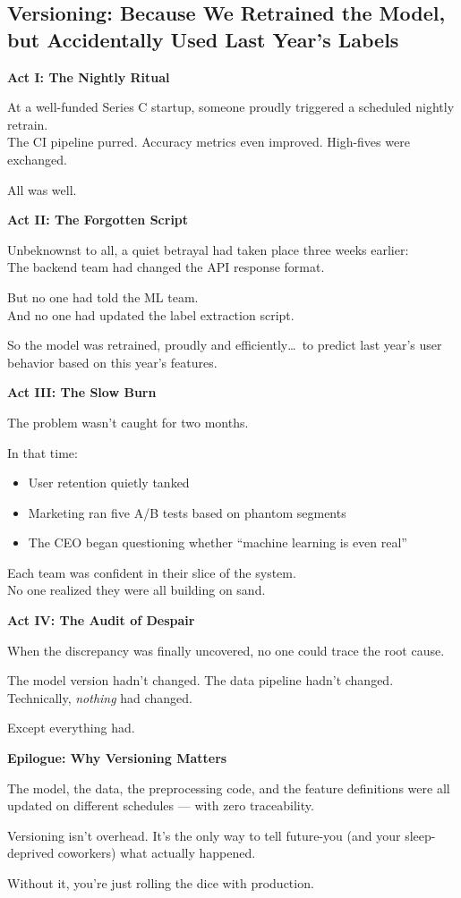 \subsection{Versioning: Because We Retrained the Model, but Accidentally Used Last Year’s Labels}

\textbf{Act I: The Nightly Ritual}

At a well-funded Series C startup, someone proudly triggered a scheduled nightly retrain. \\
The CI pipeline purred. Accuracy metrics even improved. High-fives were exchanged.

All was well.

\vspace{1em}
\textbf{Act II: The Forgotten Script}

Unbeknownst to all, a quiet betrayal had taken place three weeks earlier: \\
The backend team had changed the API response format.

But no one had told the ML team. \\
And no one had updated the label extraction script.

So the model was retrained, proudly and efficiently\ldots\ to predict last year’s user behavior based on this year’s features.

\vspace{1em}
\textbf{Act III: The Slow Burn}

The problem wasn’t caught for two months.

In that time:
\begin{itemize}
    \item User retention quietly tanked
    \item Marketing ran five A/B tests based on phantom segments
    \item The CEO began questioning whether ``machine learning is even real''
\end{itemize}

Each team was confident in their slice of the system. \\
No one realized they were all building on sand.

\vspace{1em}
\textbf{Act IV: The Audit of Despair}

When the discrepancy was finally uncovered, no one could trace the root cause.

The model version hadn’t changed. The data pipeline hadn’t changed.\\
Technically, \textit{nothing} had changed.

Except everything had.

\vspace{1em}
\textbf{Epilogue: Why Versioning Matters}

The model, the data, the preprocessing code, and the feature definitions were all updated on different schedules --- with zero traceability.

Versioning isn’t overhead. It’s the only way to tell future-you (and your sleep-deprived coworkers) what actually happened.

Without it, you’re just rolling the dice with production.